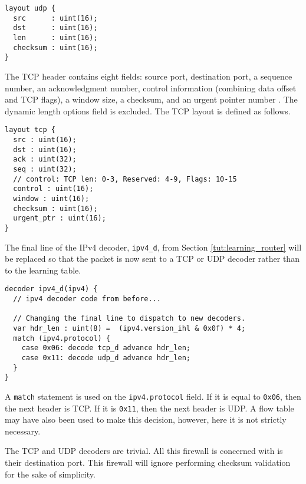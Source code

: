 \begin{codepage}
\begin{lstlisting}
layout udp {
  src      : uint(16);
  dst      : uint(16);
  len      : uint(16);
  checksum : uint(16);
}
\end{lstlisting}
\end{codepage}

The TCP header contains eight fields: source port, destination 
port, a sequence number, an acknowledgment number, control information (combining 
data offset and TCP flags), a window size, a checksum, and an urgent pointer 
number \cite{tcp_std}. 
The dynamic length options field is excluded. The TCP layout is defined as follows.

\begin{codepage}
\begin{lstlisting}
layout tcp {
  src : uint(16);
  dst : uint(16);
  ack : uint(32);
  seq : uint(32);
  // control: TCP len: 0-3, Reserved: 4-9, Flags: 10-15
  control : uint(16); 
  window : uint(16);
  checksum : uint(16);
  urgent_ptr : uint(16);
}
\end{lstlisting}
\end{codepage}

The final line of the IPv4 decoder, \texttt{ipv4\_d}, from Section \ref{tut:learning_router} will be replaced so that the packet is now sent to a TCP or UDP decoder rather than to the learning table.

\begin{codepage}
\begin{lstlisting}
decoder ipv4_d(ipv4) {
  // ipv4 decoder code from before...
  
  // Changing the final line to dispatch to new decoders.
  var hdr_len : uint(8) =  (ipv4.version_ihl & 0x0f) * 4;
  match (ipv4.protocol) {
    case 0x06: decode tcp_d advance hdr_len;
    case 0x11: decode udp_d advance hdr_len;
  }
}
\end{lstlisting}
\end{codepage} 

A \texttt{match} statement is used on the \texttt{ipv4.protocol} field. If it is equal to \texttt{0x06}, then the next header is TCP. If it is \texttt{0x11}, then the next header is UDP. A flow table may have also been used to make this decision, however, here it is not strictly necessary.

The TCP and UDP decoders are trivial. All this firewall is concerned with is their destination port. This firewall will ignore performing checksum validation for the sake of simplicity. 

